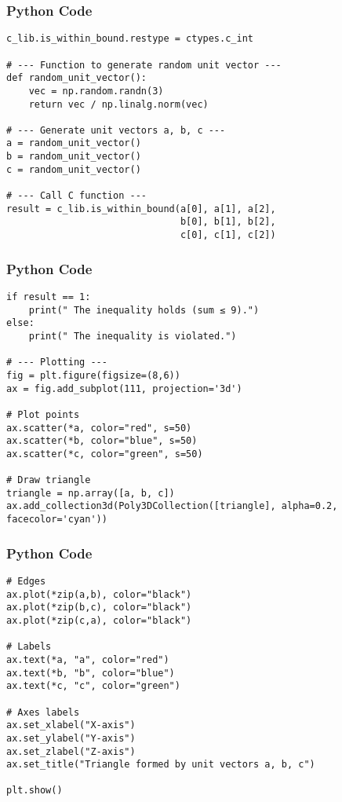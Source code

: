 \documentclass{beamer}
\begin{document}
\begin{frame}[fragile]
    \frametitle{Python Code}
    \begin{lstlisting}
c_lib.is_within_bound.restype = ctypes.c_int

# --- Function to generate random unit vector ---
def random_unit_vector():
    vec = np.random.randn(3)
    return vec / np.linalg.norm(vec)

# --- Generate unit vectors a, b, c ---
a = random_unit_vector()
b = random_unit_vector()
c = random_unit_vector()

# --- Call C function ---
result = c_lib.is_within_bound(a[0], a[1], a[2],
                               b[0], b[1], b[2],
                               c[0], c[1], c[2])
    \end{lstlisting}
\end{frame}

\begin{frame}[fragile]
    \frametitle{Python Code}
    \begin{lstlisting}
if result == 1:
    print(" The inequality holds (sum ≤ 9).")
else:
    print(" The inequality is violated.")

# --- Plotting ---
fig = plt.figure(figsize=(8,6))
ax = fig.add_subplot(111, projection='3d')

# Plot points
ax.scatter(*a, color="red", s=50)
ax.scatter(*b, color="blue", s=50)
ax.scatter(*c, color="green", s=50)

# Draw triangle
triangle = np.array([a, b, c])
ax.add_collection3d(Poly3DCollection([triangle], alpha=0.2, facecolor='cyan'))
    \end{lstlisting}
\end{frame}

\begin{frame}[fragile]
    \frametitle{Python Code}
    \begin{lstlisting}
# Edges
ax.plot(*zip(a,b), color="black")
ax.plot(*zip(b,c), color="black")
ax.plot(*zip(c,a), color="black")

# Labels
ax.text(*a, "a", color="red")
ax.text(*b, "b", color="blue")
ax.text(*c, "c", color="green")

# Axes labels
ax.set_xlabel("X-axis")
ax.set_ylabel("Y-axis")
ax.set_zlabel("Z-axis")
ax.set_title("Triangle formed by unit vectors a, b, c")

plt.show()
    \end{lstlisting}
\end{frame}
\end{document}
